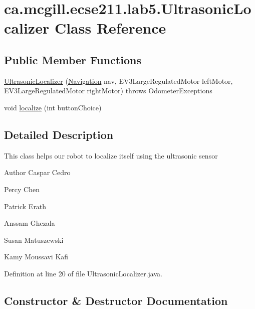 \hypertarget{classca_1_1mcgill_1_1ecse211_1_1lab5_1_1_ultrasonic_localizer}{}\section{ca.\+mcgill.\+ecse211.\+lab5.\+Ultrasonic\+Localizer Class Reference}
\label{classca_1_1mcgill_1_1ecse211_1_1lab5_1_1_ultrasonic_localizer}
\subsection*{Public Member Functions}
\begin{DoxyCompactItemize}
\item 
\hyperlink{classca_1_1mcgill_1_1ecse211_1_1lab5_1_1_ultrasonic_localizer_a47c08f2d2ec2ba664867231ca62020da}{Ultrasonic\+Localizer} (\hyperlink{classca_1_1mcgill_1_1ecse211_1_1lab5_1_1_navigation}{Navigation} nav, E\+V3\+Large\+Regulated\+Motor left\+Motor, E\+V3\+Large\+Regulated\+Motor right\+Motor)  throws Odometer\+Exceptions 
\item 
void \hyperlink{classca_1_1mcgill_1_1ecse211_1_1lab5_1_1_ultrasonic_localizer_a7fd82ab7240a07ae6947313c0769d4bc}{localize} (int button\+Choice)
\end{DoxyCompactItemize}


\subsection{Detailed Description}
This class helps our robot to localize itself using the ultrasonic sensor

\begin{DoxyAuthor}{Author}
Caspar Cedro 

Percy Chen 

Patrick Erath 

Anssam Ghezala 

Susan Matuszewski 

Kamy Moussavi Kafi 
\end{DoxyAuthor}


Definition at line 20 of file Ultrasonic\+Localizer.\+java.



\subsection{Constructor \& Destructor Documentation}
\mbox{\label{classca_1_1mcgill_1_1ecse211_1_1lab5_1_1_ultrasonic_localizer_a47c08f2d2ec2ba664867231ca62020da}} 
